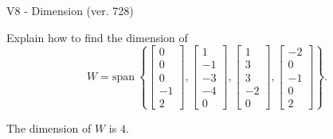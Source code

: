 \begin{exercise}
  \begin{exerciseTitle}V8 - Dimension (ver. 728)\end{exerciseTitle}
  \begin{exerciseStatement}
    Explain how to find the dimension of 
\[W=\mathrm{span}\ \left\{\left[\begin{array}{r}
0 \\
0 \\
0 \\
-1 \\
2
\end{array}\right] , \left[\begin{array}{r}
1 \\
-1 \\
-3 \\
-4 \\
0
\end{array}\right] , \left[\begin{array}{r}
1 \\
3 \\
3 \\
-2 \\
0
\end{array}\right] , \left[\begin{array}{r}
-2 \\
0 \\
-1 \\
0 \\
2
\end{array}\right]\right\}.\]



  \end{exerciseStatement}
  \begin{exerciseAnswer}
   The dimension of \(W\) is  \(4\).
  


  \end{exerciseAnswer}
\end{exercise}